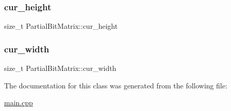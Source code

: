 \subsubsection{\texorpdfstring{cur\+\_\+height}{cur\_height}}
{\footnotesize\ttfamily size\+\_\+t Partial\+Bit\+Matrix\+::cur\+\_\+height\hspace{0.3cm}{\ttfamily [private]}}

\mbox{\label{classPartialBitMatrix_a5684506338c5c27b8936f42e34107267}} 
\subsubsection{\texorpdfstring{cur\+\_\+width}{cur\_width}}
{\footnotesize\ttfamily size\+\_\+t Partial\+Bit\+Matrix\+::cur\+\_\+width\hspace{0.3cm}{\ttfamily [private]}}



The documentation for this class was generated from the following file\+:\begin{DoxyCompactItemize}
\item 
\hyperlink{main_8cpp}{main.\+cpp}\end{DoxyCompactItemize}
